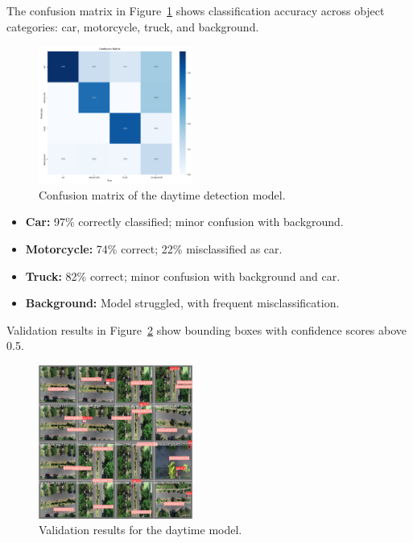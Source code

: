 The confusion matrix in Figure~\ref{fig:confusion_matrix_siang} shows classification accuracy across object categories: car, motorcycle, truck, and background.

\begin{figure}[H]
\centering
\includegraphics[width=0.45\textwidth]{gambar/confusion_siang.png}
\caption{Confusion matrix of the daytime detection model.}
\label{fig:confusion_matrix_siang}
\end{figure}

\begin{itemize}
    \item \textbf{Car:} 97\% correctly classified; minor confusion with background.
    \item \textbf{Motorcycle:} 74\% correct; 22\% misclassified as car.
    \item \textbf{Truck:} 82\% correct; minor confusion with background and car.
    \item \textbf{Background:} Model struggled, with frequent misclassification.
\end{itemize}

Validation results in Figure~\ref{fig:validasi_siang} show bounding boxes with confidence scores above 0.5.

\begin{figure}[H]
\centering
\includegraphics[width=0.45\textwidth]{gambar/val_batch_siang.jpg}
\caption{Validation results for the daytime model.}
\label{fig:validasi_siang}
\end{figure}

